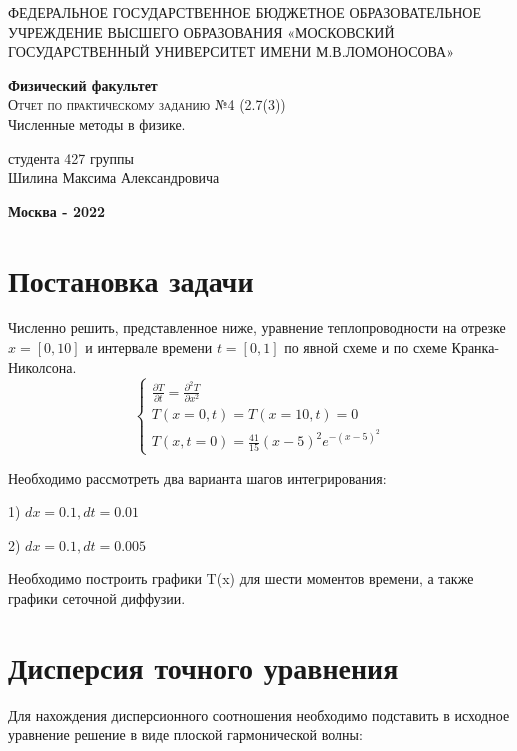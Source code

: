 \documentclass[diploma]{nanolab2015}
\begin{document}
\begin{titlepage}
\begin{center}
    \large
    ФЕДЕРАЛЬНОЕ ГОСУДАРСТВЕННОЕ БЮДЖЕТНОЕ ОБРАЗОВАТЕЛЬНОЕ УЧРЕЖДЕНИЕ ВЫСШЕГО ОБРАЗОВАНИЯ «МОСКОВСКИЙ ГОСУДАРСТВЕННЫЙ УНИВЕРСИТЕТ ИМЕНИ М.В.ЛОМОНОСОВА»
     
    \textbf{Физический факультет}\\
    \vspace{4cm}
    \textsc{\Large Отчет по практическому заданию №4 (2.7(3))}\\[5mm]
    {\LARGE Численные методы в физике.}
\end{center}
\vspace{7cm}
\null
\begin{flushright}
\normalsize студента 427 группы
\\Шилина Максима Александровича
\end{flushright}
\vfill
\begin{center}
\textbf{Москва - 2022}
\end{center}
\end{titlepage}

\tableofcontents{}  %
\newpage

\section{Постановка задачи}
Численно решить, представленное ниже, уравнение теплопроводности на отрезке $x = [0,10]$ и интервале времени $t=[0,1]$ по явной схеме и по схеме Кранка-Николсона.
\begin{equation*}
\begin{cases}
   \frac{\partial T}{\partial t} = \frac{\partial^2 T}{\partial x^2}\\
   T(x=0, t)=T(x=10, t) = 0\\
   T(x, t=0) = \frac{41}{15} (x-5)^2 e^{-(x-5)^2}
 \end{cases}
\end{equation*}

Необходимо рассмотреть два варианта шагов интегрирования:

1) $dx = 0.1, dt = 0.01$

2) $dx = 0.1, dt = 0.005$

Необходимо построить графики T(x) для шести моментов времени, а также графики сеточной диффузии.

\section{Дисперсия точного уравнения}
Для нахождения дисперсионного соотношения необходимо подставить в исходное уравнение решение в виде плоской гармонической волны:
\end{document}
